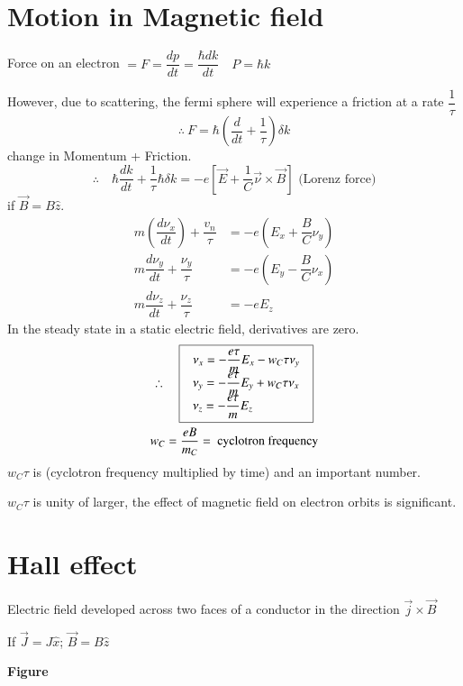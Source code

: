 \section{Motion in Magnetic field}

Force on an electron $=F=\dfrac{dp}{dt}=\dfrac{\hbar dk}{dt}\quad P=\hbar k$

However, due to scattering, the fermi sphere will experience a friction at a rate $\dfrac{1}{\tau}$
$$
\therefore \ F=\hbar \left(\dfrac{d}{dt}+\dfrac{1}{\tau}\right)\delta k
$$
change in Momentum + Friction.
$$
\therefore\quad \hbar \dfrac{dk}{dt}+\dfrac{1}{\tau}\hbar \delta k=-e\left[\overrightarrow{E}+\dfrac{1}{C}\overrightarrow{\nu}\times \overrightarrow{B}\right] \text{ (Lorenz force)}
$$
if $\overrightarrow{B}=B\widehat{z}$.
\begin{align*}
m\left(\dfrac{d\nu_{x}}{dt}\right)+\dfrac{v_{n}}{\tau} &= -e\left(E_{x}+\dfrac{B}{C}\nu_{y}\right)\\[3pt]
m\dfrac{d\nu_{y}}{dt}+\dfrac{\nu_{y}}{\tau} &= -e\left(E_{y}-\dfrac{B}{C}\nu_{x}\right)\\
m\dfrac{d\nu_{z}}{dt}+\dfrac{\nu_{z}}{\tau} &= -eE_{z}
\end{align*}
In the steady state in a static electric field, derivatives are zero.
\begin{gather*}
\therefore\quad 
\fbox{
$
\begin{array}{l}
\nu_{x}=-\dfrac{e\tau}{m}E_{x}-w_{C}\tau \nu_{y}\\
\nu_{y}=-\dfrac{e\tau}{m}E_{y}+w_{C}\tau \nu_{x}\\
\nu_{z}=-\dfrac{e\tau}{m}E_{z}
\end{array}
$
}\\
w_{C}=\dfrac{eB}{m_{C}}=\text{ cyclotron frequency}
\end{gather*}
$w_{C}\tau$ is (cyclotron frequency multiplied by time) and an important number.

$w_{C}\tau$ is unity of larger, the effect of magnetic field on electron orbits is significant.

\section*{Hall effect}

Electric field developed across two faces of a conductor in the direction $\overrightarrow{j}\times \overrightarrow{B}$

If $\overrightarrow{J}=J\widehat{x}$; $\overrightarrow{B}=B\widehat{z}$
\begin{center}
{\bf Figure}
\end{center}

